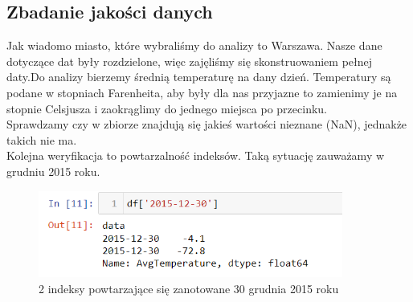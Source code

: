 \documentclass[12pt]{mwart}
\begin{document}
\subsection{Zbadanie jakości danych}
Jak wiadomo miasto, które wybraliśmy do analizy to Warszawa. Nasze dane dotyczące dat były rozdzielone, więc zajęliśmy się skonstruowaniem pełnej daty.Do analizy bierzemy średnią temperaturę na dany dzień. Temperatury są podane w stopniach Farenheita, aby były dla nas przyjazne to zamienimy je na stopnie Celsjusza i zaokrąglimy do jednego miejsca po przecinku. \\
Sprawdzamy czy w zbiorze znajdują się jakieś wartości nieznane (NaN), jednakże takich nie ma.\\
Kolejna weryfikacja to powtarzalność indeksów. Taką sytuację zauważamy w grudniu 2015 roku. \\
\begin{figure}[h]
	
	\includegraphics[width=10cm]{indeks.png}
	\caption{2 indeksy powtarzające się zanotowane 30 grudnia 2015 roku}
\end{figure}
\end{document}
